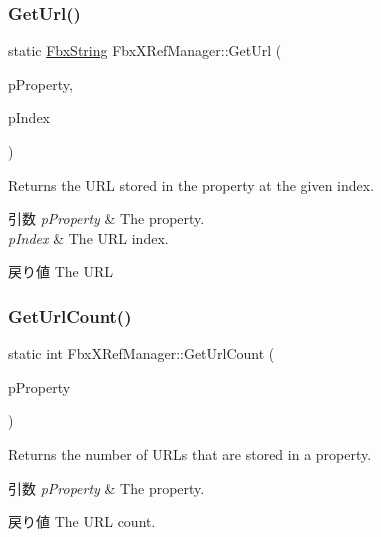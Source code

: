 \subsubsection{\texorpdfstring{Get\+Url()}{GetUrl()}}
{\footnotesize\ttfamily static \hyperlink{class_fbx_string}{Fbx\+String} Fbx\+X\+Ref\+Manager\+::\+Get\+Url (\begin{DoxyParamCaption}\item[{\hyperlink{class_fbx_property}{Fbx\+Property} const \&}]{p\+Property,  }\item[{int}]{p\+Index }\end{DoxyParamCaption})\hspace{0.3cm}{\ttfamily [static]}}

Returns the U\+RL stored in the property at the given index. 
\begin{DoxyParams}{引数}
{\em p\+Property} & The property. \\
\hline
{\em p\+Index} & The U\+RL index. \\
\hline
\end{DoxyParams}
\begin{DoxyReturn}{戻り値}
The U\+RL 
\end{DoxyReturn}
\mbox{\label{class_fbx_x_ref_manager_a9ea29928247d5542e8eaafbea0647201}} 
\subsubsection{\texorpdfstring{Get\+Url\+Count()}{GetUrlCount()}\hspace{0.1cm}{\footnotesize\ttfamily [1/2]}}
{\footnotesize\ttfamily static int Fbx\+X\+Ref\+Manager\+::\+Get\+Url\+Count (\begin{DoxyParamCaption}\item[{\hyperlink{class_fbx_property}{Fbx\+Property} const \&}]{p\+Property }\end{DoxyParamCaption})\hspace{0.3cm}{\ttfamily [static]}}

Returns the number of U\+R\+Ls that are stored in a property. 
\begin{DoxyParams}{引数}
{\em p\+Property} & The property. \\
\hline
\end{DoxyParams}
\begin{DoxyReturn}{戻り値}
The U\+RL count. 
\end{DoxyReturn}
\mbox{\label{class_fbx_x_ref_manager_a619fbdf87fe5db100ad4eada1373b9d0}} 
